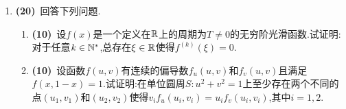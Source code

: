 \documentclass{ctexart}
\begin{document}
\begin{enumerate}[leftmargin=*,label=\textbf{\arabic*.}]
\begin{enumerate}[label=\tbf{(\arabic*)}]
        \end{enumerate}
    \item \textbf{(20)}\ 回答下列问题.
        \begin{enumerate}[label=\tbf{(\arabic*)}]
            \item \textbf{(10)}\ 设$f(x)$是一个定义在$\mathbb{R}$上的周期为$T\neq0$的无穷阶光滑函数.试证明:对于任意$k\in\mathbb{N}^*$,总存在$\xi\in\mathbb{R}$使得$f^{(k)}(\xi)=0$.
            \item \textbf{(10)}\ 设函数$f(u,v)$有连续的偏导数$f_u(u,v)$和$f_v(u,v)$且满足$f(x,1-x)=1$.试证明:在单位圆周$S:u^2+v^2=1$上至少存在两个不同的点$(u_1,v_1)$和$(u_2,v_2)$使得$v_if_u(u_i,v_i)=u_if_v(u_i,v_i)$,其中$i=1,2$.
        \end{enumerate}
\end{enumerate}
\end{document}
